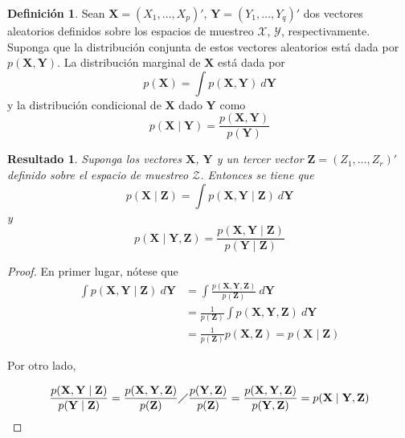 \documentclass[
  spanish,
]{book}
\newtheorem{proposition}{Resultado}[chapter]
\theoremstyle{definition}
\newtheorem{definition}{Definición}[chapter]
\theoremstyle{definition}
\theoremstyle{definition}
\theoremstyle{remark}
\begin{document}
\begin{definition}
\protect\hypertarget{def:unnamed-chunk-4}{}{\label{def:unnamed-chunk-4} }Sean \(\mathbf{X}=(X_1,\ldots,X_p)'\), \(\mathbf{Y}=(Y_1,\ldots,Y_q)'\) dos vectores aleatorios definidos sobre los espacios de muestreo \(\mathcal{X}\), \(\mathcal{Y}\), respectivamente. Suponga que la distribución conjunta de estos vectores aleatorios está dada por \(p(\mathbf{X},\mathbf{Y})\). La distribución marginal de \(\mathbf{X}\) está dada por
\begin{equation}
p(\mathbf{X})=\int p(\mathbf{X},\mathbf{Y})\ d\mathbf{Y}
\end{equation}
y la distribución condicional de \(\mathbf{X}\) dado \(\mathbf{Y}\) como
\begin{equation}
p(\mathbf{X} \mid \mathbf{Y})
=\frac{p(\mathbf{X},\mathbf{Y})}{p(\mathbf{Y})}
\end{equation}
\end{definition}

\begin{proposition}
\protect\hypertarget{prp:Res121}{}{\label{prp:Res121} }Suponga los vectores \(\mathbf{X}\), \(\mathbf{Y}\) y un tercer vector \(\mathbf{Z}=(Z_1,\ldots,Z_r)'\) definido sobre el espacio de muestreo \(\mathcal{Z}\). Entonces se tiene que
\begin{equation}
p(\mathbf{X} \mid \mathbf{Z})=\int p(\mathbf{X},\mathbf{Y} \mid \mathbf{Z})\ d\mathbf{Y}
\end{equation}
y
\begin{equation}
p(\mathbf{X} \mid \mathbf{Y},\mathbf{Z})=\frac{p(\mathbf{X},\mathbf{Y} \mid \mathbf{Z})}{p(\mathbf{Y} \mid \mathbf{Z})}
\end{equation}
\end{proposition}

\begin{proof}
\iffalse{} {Prueba. } \fi{}En primer lugar, nótese que
\begin{align*}
\int p(\mathbf{X},\mathbf{Y} \mid \mathbf{Z})\ d\mathbf{Y}&=
\int \frac{p(\mathbf{X},\mathbf{Y},\mathbf{Z})}{p(\mathbf{Z})}\ d\mathbf{Y}\\
&=\frac{1}{p(\mathbf{Z})} \int p(\mathbf{X},\mathbf{Y},\mathbf{Z}) \ d\mathbf{Y}\\
&=\frac{1}{p(\mathbf{Z})} p(\mathbf{X},\mathbf{Z})=p(\mathbf{X} \mid \mathbf{Z})
\end{align*}

Por otro lado,

\begin{align*}
\frac{p(\mathbf{X},\mathbf{Y} \mid \mathbf{Z})}{p(\mathbf{Y} \mid \mathbf{Z})}=
\frac{p(\mathbf{X},\mathbf{Y},\mathbf{Z})}{p(\mathbf{Z})} \diagup
\frac{p(\mathbf{Y},\mathbf{Z})}{p(\mathbf{Z})}
=\frac{p(\mathbf{X},\mathbf{Y},\mathbf{Z})}{p(\mathbf{Y},\mathbf{Z})}=p(\mathbf{X} \mid \mathbf{Y},\mathbf{Z})
\end{align*}
\end{proof}
\end{document}
